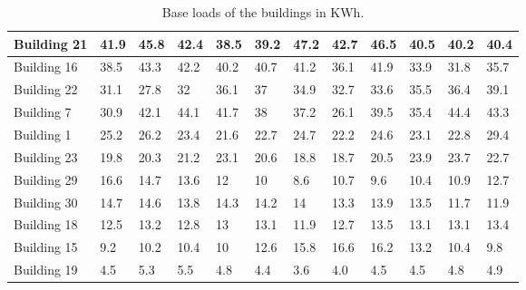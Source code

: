 \begin{table}[!ht]
\begin{tabular}{ | l | l | l | l | l | l | l | l | l | l | l | l | }
	Building 21 & 41.9 & 45.8 & 42.4 & 38.5 & 39.2 & 47.2 & 42.7 & 46.5 & 40.5 & 40.2 & 40.4 \\ \hline
	Building 16 & 38.5 & 43.3 & 42.2 & 40.2 & 40.7 & 41.2 & 36.1 & 41.9 & 33.9 & 31.8 & 35.7 \\ \hline
	Building 22 & 31.1 & 27.8 & 32 & 36.1 & 37 & 34.9 & 32.7 & 33.6 & 35.5 & 36.4 & 39.1 \\ \hline
	Building 7 & 30.9 & 42.1 & 44.1 & 41.7 & 38 & 37.2 & 26.1 & 39.5 & 35.4 & 44.4 & 43.3 \\ \hline
	Building 1 & 25.2 & 26.2 & 23.4 & 21.6 & 22.7 & 24.7 & 22.2 & 24.6 & 23.1 & 22.8 & 29.4 \\ \hline
	Building 23 & 19.8 & 20.3 & 21.2 & 23.1 & 20.6 & 18.8 & 18.7 & 20.5 & 23.9 & 23.7 & 22.7 \\ \hline
	Building 29 & 16.6 & 14.7 & 13.6 & 12 & 10 & 8.6 & 10.7 & 9.6 & 10.4 & 10.9 & 12.7 \\ \hline
	Building 30 & 14.7 & 14.6 & 13.8 & 14.3 & 14.2 & 14 & 13.3 & 13.9 & 13.5 & 11.7 & 11.9 \\ \hline
	Building 18 & 12.5 & 13.2 & 12.8 & 13 & 13.1 & 11.9 & 12.7 & 13.5 & 13.1 & 13.1 & 13.4 \\ \hline
	Building 15 & 9.2 & 10.2 & 10.4 & 10 & 12.6 & 15.8 & 16.6 & 16.2 & 13.2 & 10.4 & 9.8 \\ \hline
	Building 19 & 4.5 & 5.3 & 5.5 & 4.8 & 4.4 & 3.6 & 4.0 & 4.5 & 4.5 & 4.8 & 4.9 \\ \hline
\end{tabular}
\caption{Base loads of the buildings in KWh.}
\end{table}
